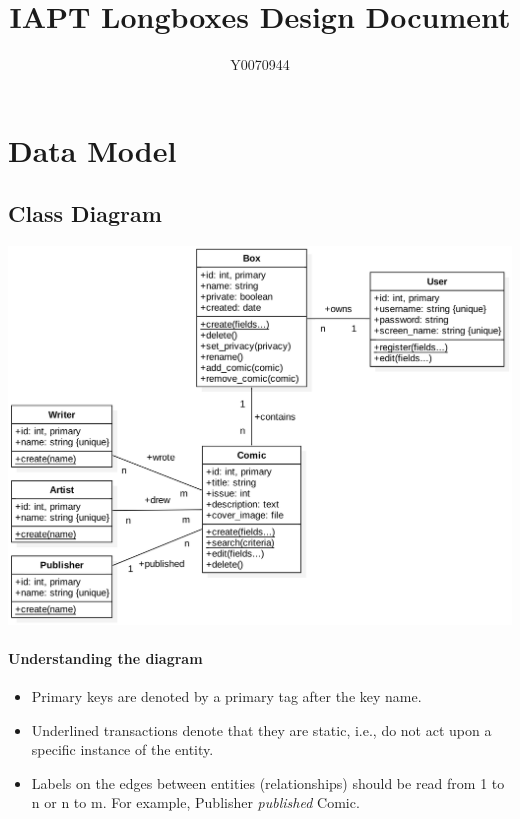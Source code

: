 \documentclass[fontsize=12pt,a4paper]{scrreprt}
\author{Y0070944}
\title{IAPT Longboxes Design Document}
\begin{document}
\maketitle
\setcounter{page}{1}

\chapter{Data Model}

\section{Class Diagram}

\includegraphics[width=\textwidth]{uml.png}

\subsubsection{Understanding the diagram}
\begin{itemize}[itemsep=-0.5em]
  \item Primary keys are denoted by a \textsf{primary} tag after the key name.

  \item Underlined transactions denote that they are static, i.e., do not act upon a specific instance of the entity.

  \item Labels on the edges between entities (relationships) should be read from \textsf{1 to n} or \textsf{n to m}. For example, \textsf{Publisher \emph{published} Comic}.
\end{itemize}
\end{document}
